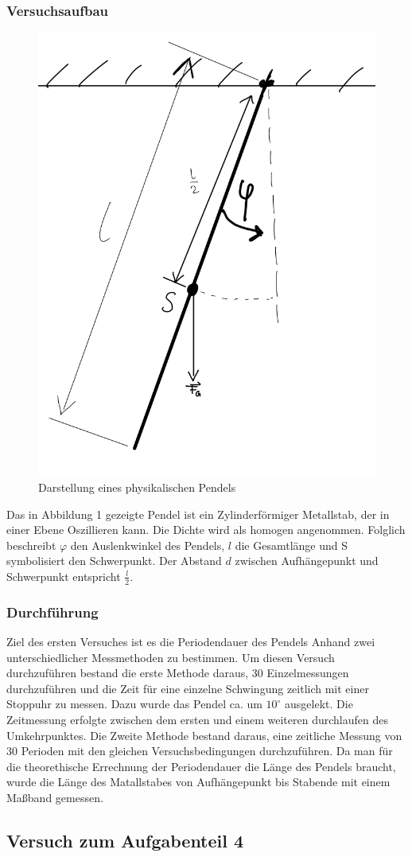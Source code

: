 \documentclass[11pt,a4paper]{article}
\begin{document}
      \subsubsection{Versuchsaufbau}
      \begin{figure}[h]
      	\includegraphics[width=0.4\linewidth]{physikalisches Pendel.png}
      	\centering
      	\caption{Darstellung eines physikalischen Pendels \text{[1]}}
      \end{figure}
Das in Abbildung 1 gezeigte Pendel  ist ein Zylinderförmiger Metallstab, der in einer Ebene Oszillieren kann. Die Dichte wird als homogen angenommen. Folglich beschreibt $\varphi$  den Auslenkwinkel des Pendels, $l$ die Gesamtlänge und S symbolisiert den Schwerpunkt. Der Abstand $d$ zwischen Aufhängepunkt und Schwerpunkt entspricht $\frac{l}{2}$.
      \subsubsection{Durchführung}

Ziel des ersten Versuches ist es die Periodendauer des Pendels Anhand zwei unterschiedlicher Messmethoden zu bestimmen. Um diesen Versuch durchzuführen bestand die erste Methode daraus, 30 Einzelmessungen durchzuführen und die Zeit für eine einzelne Schwingung zeitlich mit einer Stoppuhr zu messen. Dazu wurde das Pendel ca. um $10^\circ$ ausgelekt.
 Die Zeitmessung erfolgte zwischen dem ersten und einem weiteren durchlaufen des Umkehrpunktes.
 Die Zweite Methode bestand daraus, eine zeitliche Messung von 30 Perioden mit den gleichen Versuchsbedingungen durchzuführen.
 Da man für die theorethische Errechnung der Periodendauer die Länge des Pendels braucht, wurde die Länge des Matallstabes von Aufhängepunkt bis Stabende mit einem Maßband gemessen.

\subsection{Versuch zum Aufgabenteil 4}
\end{document}
